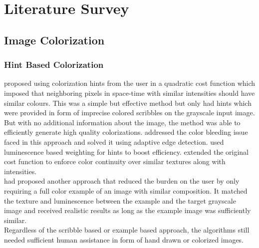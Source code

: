 \documentclass[oneside,a4paper,12pt]{report}
\begin{document}
\section{Literature Survey}
\subsection{Image Colorization}
\subsubsection{Hint Based Colorization}
\hspace*{0.25 in}\cite{levin2004colorization} proposed using colorization hints from the user in a quadratic cost function which imposed that neighboring pixels in space-time with similar intensities should have similar colours. This was a simple but effective method but only had hints which were provided in form of imprecise colored scribbles on the grayscale input image. But with no additional information about the image, the method was able to efficiently generate high quality colorizations. \cite{huang2005edge} addressed the color bleeding issue faced in this approach and solved it using adaptive edge detection. \cite{yatziv2006chrominance} used luminescence based weighting for hints to boost efficiency. \cite{qu2006manga} extended the original cost function to enforce color continuity over similar textures along with intensities.\\
		\hspace*{0.25 in}\cite{welsh2002color} had proposed another approach that reduced the burden on the user by only requiring a full color example of an image with similar composition. It matched the texture and luminescence between the example and the target grayscale image and received realistic results as long as the example image was sufficiently similar.\\
		\hspace*{0.25 in}Regardless of the scribble based or example based approach, the algorithms still needed sufficient human assistance in form of hand drawn or colorized images.
\end{document}
